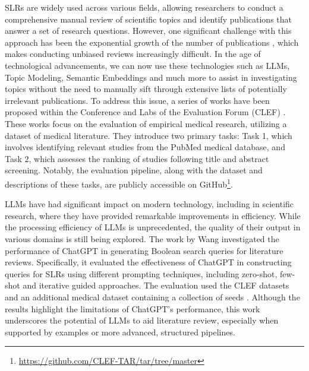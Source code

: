 SLRs are widely used across various fields, allowing researchers to conduct a comprehensive manual review of scientific topics and identify publications that answer a set of research questions. However, one significant challenge with this approach has been the exponential growth of the number of publications \autocite{Bornmann2021}, which makes conducting unbiased reviews increasingly difficult. In the age of technological advancements, we can now use these technologies such as LLMs, Topic Modeling, Semantic Embeddings and much more to assist in investigating topics without the need to manually sift through extensive lists of potentially irrelevant publications. To address this issue, a series of works have been proposed within the Conference and Labs of the Evaluation Forum (CLEF) \autocite{kanoulas2017clef, kanoulas2018clef, kanoulas2019clef}. These works focus on the evaluation of empirical medical research, utilizing a dataset of medical literature. They introduce two primary tasks: Task 1, which involves identifying relevant studies from the PubMed medical database, and Task 2, which assesses the ranking of studies following title and abstract screening. Notably, the evaluation pipeline, along with the dataset and descriptions of these tasks, are publicly accessible on GitHub\footnote{\url{https://github.com/CLEF-TAR/tar/tree/master}}.

LLMs have had significant impact on modern technology, including in scientific research, where they have provided remarkable improvements in efficiency. While the processing efficiency of LLMs is unprecedented, the quality of their output in various domains is still being explored. The work by Wang \autocite{wang2023can} investigated the performance of ChatGPT in generating Boolean search queries for literature reviews. Specifically, it evaluated the effectiveness of ChatGPT in constructing queries for SLRs using different prompting techniques, including zero-shot, few-shot and iterative guided approaches. The evaluation used the CLEF datasets \autocite{kanoulas2017clef, kanoulas2018clef, kanoulas2019clef} and an additional medical dataset containing a collection of seeds \autocite{Wang_2022}. Although the results highlight the limitations of ChatGPT's performance, this work underscores the potential of LLMs to aid literature review, especially when supported by examples or more advanced, structured pipelines.

